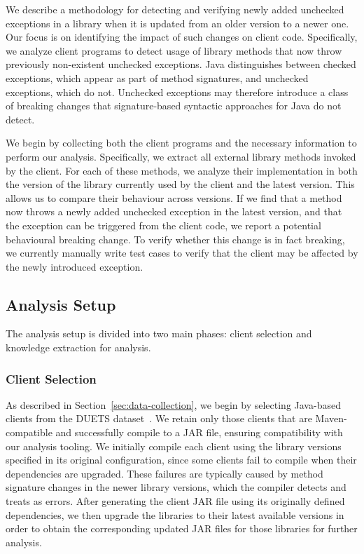 We describe a methodology for detecting and verifying newly added unchecked exceptions in a library when it is updated from an older version to a newer one. Our focus is on identifying the impact of such changes on client code. Specifically, we analyze client programs to detect usage of library methods that now throw previously non-existent unchecked exceptions. Java distinguishes between checked exceptions, which appear as part of method signatures, and unchecked exceptions, which do not. Unchecked exceptions may therefore introduce a class of breaking changes that signature-based syntactic approaches for Java do not detect.

We begin by collecting both the client programs and the necessary information to perform our analysis. Specifically, we extract all external library methods invoked by the client. For each of these methods, we analyze their implementation in both the version of the library currently used by the client and the latest version. This allows us to compare their behaviour across versions. If we find that a method now throws a newly added unchecked exception in the latest version, and that the exception can be triggered from the client code, we report a potential behavioural breaking change. To verify whether this change is in fact breaking, we currently manually write test cases to verify that the client may be affected by the newly introduced exception.

\subsection{Analysis Setup}

The analysis setup is divided into two main phases: client selection and knowledge extraction for analysis.

\subsubsection{Client Selection}

As described in Section~\ref{sec:data-collection}, we begin by selecting Java-based clients from the DUETS dataset~\cite{durieux21:_duets}. We retain only those clients that are Maven-compatible and successfully compile to a JAR file, ensuring compatibility with our analysis tooling. We initially compile each client using the library versions specified in its original configuration, since some clients fail to compile when their dependencies are upgraded. These failures are typically caused by method signature changes in the newer library versions, which the compiler detects and treats as errors. After generating the client JAR file using its originally defined dependencies, we then upgrade the libraries to their latest available versions in order to obtain the corresponding updated JAR files for those libraries for further analysis.


